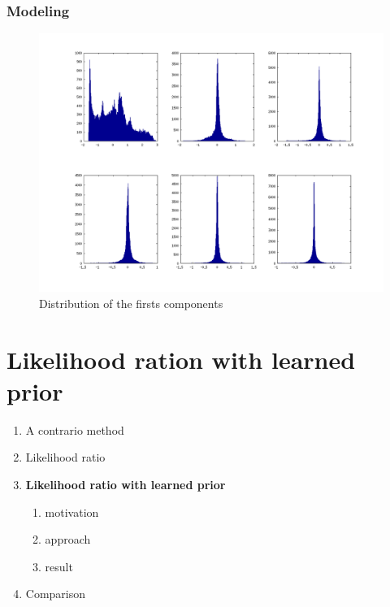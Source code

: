\documentclass[compress]{beamer} %
\begin{document}
  \begin{frame}
  \frametitle{Modeling}
	\begin{figure}[h!]
	\centering
	\begin{minipage}{0.8\linewidth}
	\includegraphics[width=\linewidth]{hist}
	  
	\end{minipage}

	    \caption{Distribution of the firsts components}
	
	\end{figure}      
 \end{frame}
 
 \section{Likelihood ration with learned prior}
 \begin{frame}
 \scriptsize
 {
 \begin{enumerate}


  \item A contrario method
  \item Likelihood ratio
  \item \textbf{Likelihood ratio with learned prior}
  \begin{enumerate}
   \item motivation
   \item approach
   \item result
  \end{enumerate}

  \item Comparison
  
 \end{enumerate}

  
 }
 \end{frame} 
 
\end{document}
